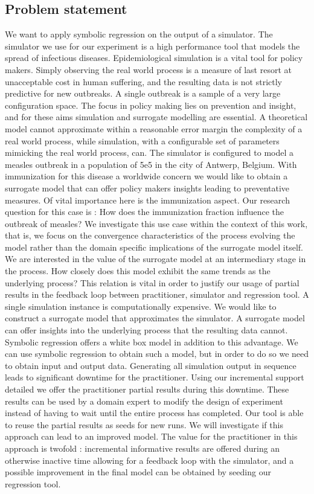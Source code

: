 \subsection{Problem statement}
We want to apply symbolic regression on the output of a simulator. The simulator we use for our experiment is a high performance tool \citep{stride} that models the spread of infectious diseases. 
Epidemiological simulation is a vital tool for policy makers. Simply observing the real world process is a measure of last resort at unacceptable cost in human suffering, and the resulting data is not strictly predictive for new outbreaks. A single outbreak is a sample of a very large configuration space. The focus in policy making lies on prevention and insight, and for these aims simulation and surrogate modelling are essential. A theoretical model cannot approximate within a reasonable error margin the complexity of a real world process, while simulation, with a configurable set of parameters mimicking the real world process, can.
The simulator is configured to model a measles outbreak in a population of 5e5 in the city of Antwerp, Belgium. With immunization for this disease a worldwide concern we would like to obtain a surrogate model that can offer policy makers insights leading to preventative measures. Of vital importance here is the immunization aspect. Our research question for this case is : How does the immunization fraction influence the outbreak of measles?
We investigate this use case within the context of this work, that is, we focus on the convergence characteristics of the process evolving the model rather than the domain specific implications of the surrogate model itself. We are interested in the value of the surrogate model at an intermediary stage in the process. How closely does this model exhibit the same trends as the underlying process? This relation is vital in order to justify our usage of partial results in the feedback loop between practitioner, simulator and regression tool.
A single simulation instance is computationally expensive. We would like to construct a surrogate model that approximates the simulator. A surrogate model can offer insights into the underlying process that the resulting data cannot. Symbolic regression offers a white box model in addition to this advantage. We can use symbolic regression to obtain such a model, but in order to do so we need to obtain input and output data. 
Generating all simulation output in sequence leads to significant downtime for the practitioner. Using our incremental support detailed we offer the practitioner partial results during this downtime. These results can be used by a domain expert to modify the design of experiment instead of having to wait until the entire process has completed. Our tool is able to reuse the partial results as seeds for new runs. We will investigate if this approach can lead to an improved model.
The value for the practitioner in this approach is twofold : incremental informative results are offered during an otherwise inactive time allowing for a feedback loop with the simulator, and a possible improvement in the final model can be obtained by seeding our regression tool.
